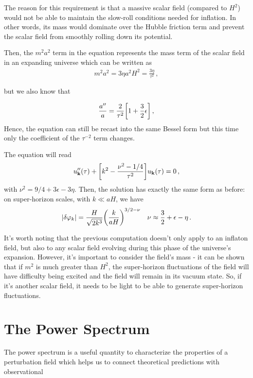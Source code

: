 The reason for this requirement is that a massive scalar field (compared to $H^2$) would not be able to maintain the slow-roll conditions needed for inflation. In other words, its mass would dominate over the Hubble friction term and prevent the scalar field from smoothly rolling down its potential.

 Then, the \(m^2 a^2\) term in the equation represents the mass term of the scalar field in an expanding universe which can be written as
\begin{align}
    m^2 a^2 = 3 \eta a^2 H^2 = \frac{3 \eta}{\tau^2}\label{2.104}
    \,,
\end{align}

but we also know that 

\begin{align}
    \frac{a''}{a} = \frac{2}{\tau^2 } \qty[ 1 + \frac{3}{2} \epsilon ]
    \,, \label{2.105}
\end{align}
%
Hence, the equation can still be recast into the same Bessel form but this time only the coefficient of the \(\tau^{-2}\) term changes.

The equation will read 
%
\begin{align}
    u''_{\mathbf{k}} (\tau ) + \qty[ k^2 - \frac{\nu^2 - 1/4}{\tau^2}]  u_{\mathbf{k}}(\tau ) = 0
    \,,\label{2.106}
\end{align}
%
with \(\nu^2 = 9/4 + 3 \epsilon - 3 \eta\). 
Then, the solution has exactly the same form as before:\\
on super-horizon scales, with \(k \ll aH\), we have
%
\begin{align}
    \abs{ \delta \varphi _k} = \frac{H}{\sqrt{2 k^3}} \qty( \frac{k}{aH})^{3/2 - \nu }
    &&
    \nu \approx \frac{3}{2} + \epsilon - \eta
    \,.\label{2.107}
\end{align}

It's worth noting that the previous computation doesn't only apply to an inflaton field, but also to any scalar field evolving during this phase of the universe's expansion. However, it's important to consider the field's mass - it can be shown that if $m^2$ is much greater than $H^2$, the super-horizon fluctuations of the field will have difficulty being excited and the field will remain in its vacuum state. So, if it's another scalar field, it needs to be light to be able to generate super-horizon fluctuations.








\section{The Power Spectrum} \label{section 2.5}
The power spectrum is a useful quantity to characterize the properties of a perturbation field which helps us to connect theoretical predictions with observational

